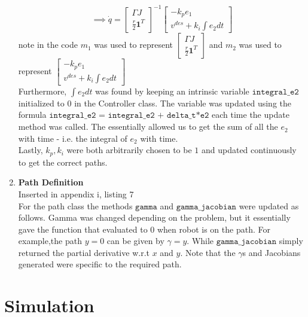 \documentclass{article}
\begin{document}
\begin{enumerate}
$$ \implies   \Dot{q} = \begin{bmatrix}
\Gamma J\\
\frac{r}{2}\textbf{1}^T
\end{bmatrix}^{-1} \begin{bmatrix} -k_pe_1\\ v^{des} + k_i \int e_2 dt \end{bmatrix} $$
note in the code $m_1$ was used to represent $ \begin{bmatrix}
\Gamma J\\
\frac{r}{2}\textbf{1}^T
\end{bmatrix} $  and $m_2$ was used to represent   $\begin{bmatrix} -k_pe_1\\ v^{des} + k_i \int e_2 dt \end{bmatrix} $\\ 
Furthermore, $\int e_2 dt$ was found by keeping an intrinsic variable $\texttt{integral\_e2 }$ initialized to $0$ in the Controller class. The variable was updated using the formula $\texttt{integral\_e2 = integral\_e2 + delta\_t*e2}$ each time the update method was called. The essentially allowed us to get the sum of all the $e_2$ with time - i.e. the integral of $e_2$ with time. \\ 
Lastly, $k_p, k_i$ were both arbitrarily  chosen to be $1$ and updated continuously to get the correct paths. \\  

    \item
        \textbf{Path Definition} \\ 
         Inserted in appendix i, listing  7 \\ 
         For the path class the methods $\texttt{gamma} $ and $ \texttt{gamma\_jacobian}$ were updated as follows. Gamma was changed depending on the problem, but it essentially gave the function that evaluated to $0$ when robot is on the path. For example,the path  $y = 0$ can be given by $\gamma = y$. While  $\texttt{gamma\_jacobian}$ simply returned the partial derivative w.r.t $x$ and $y$. 
         Note that the $\gamma$s and Jacobians  generated  were specific to the required path. 
         
\end{enumerate}         
\newpage

\section{Simulation}
\end{document}
